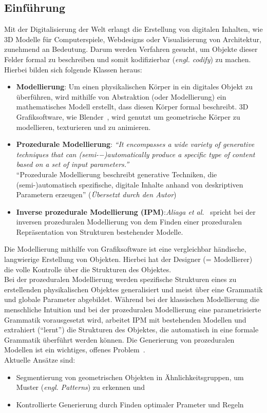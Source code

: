 \documentclass[11pt]{article}
\begin{document}
    \subsection{Einführung}
    Mit der Digitalisierung der Welt erlangt die Erstellung von digitalen Inhalten, wie 3D Modelle für Computerspiele,
    Webdesigns oder Visualisierung von Architektur, zunehmend an Bedeutung.
    Darum werden Verfahren gesucht, um Objekte dieser Felder formal zu beschreiben und somit kodifizierbar
    (\textit{engl. codify}) zu machen.
    Hierbei bilden sich folgende Klassen heraus:
    \begin{itemize}
        \item \textbf{Modellierung}: Um einen physikalischen Körper in ein digitales Objekt zu überführen, wird mithilfe
        von Abstraktion (oder Modellierung) ein mathematisches Modell erstellt, dass diesen Körper formal beschreibt.
        3D Grafiksoftware, wie Blender~\cite{blender}, wird genutzt um geometrische Körper zu modellieren, texturieren
        und zu animieren.
        \item \textbf{Prozedurale Modellierung}: \textit{"`It encompasses a wide variety of generative techniques that
        can (semi-−)automatically produce a specific type of content based on a set of input
        parameters."'}~\cite{1} \\
        "`Prozedurale Modellierung beschreibt generative Techniken, die \\(semi-)automatisch spezifische, digitale
        Inhalte anhand von deskriptiven Parametern erzeugen"' (\textit{Übersetzt durch den Autor})
        \item \textbf{Inverse prozedurale Modellierung (IPM)}:\textit{Aliaga et al.}~\cite{2}
        spricht bei der inversen prozeduralen Modellierung von dem Finden einer prozeduralen Repräsentation von
        Strukturen bestehender Modelle.
    \end{itemize}
    Die Modellierung mithilfe von Grafiksoftware ist eine vergleichbar händische, langwierige Erstellung von
    Objekten.
    Hierbei hat der Designer (= Modellierer) die volle Kontrolle über die Strukturen des Objektes.\\
    Bei der prozeduralen Modellierung werden spezifische Strukturen eines zu erstellenden physikalischen Objektes
    generalisiert und meist über eine Grammatik und globale Parameter abgebildet.
    Während bei der klassischen Modellierung die menschliche Intuition und bei der prozeduralen Modellierung eine
    parametrisierte Grammatik vorausgesetzt wird, arbeitet IPM mit bestehenden Modellen und extrahiert ("`lernt"')
    die Strukturen des Objektes, die automatisch in eine formale Grammatik überführt werden können.
    Die Generierung von prozeduralen Modellen ist ein wichtiges, offenes Problem~\cite{2}.\\
    Aktuelle Ansätze sind:
    \begin{itemize}
        \item Segmentierung von geometrischen Objekten in Ähnlichkeitsgruppen, um Muster (\textit{engl. Patterns}) zu
        erkennen und
        \item Kontrollierte Generierung durch Finden optimaler Prameter und Regeln
    \end{itemize}
\end{document}
